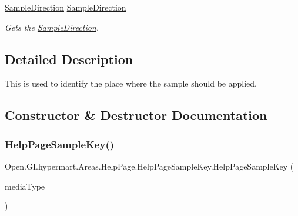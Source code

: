 \begin{DoxyCompactItemize}
\hyperlink{namespace_open_1_1_g_i_1_1hypermart_1_1_areas_1_1_help_page_a96790152101b7f9c7e4ff518bb45c822}{Sample\+Direction} \hyperlink{class_open_1_1_g_i_1_1hypermart_1_1_areas_1_1_help_page_1_1_help_page_sample_key_a62a3b3c50ce55cf2b20b4f859776f884}{Sample\+Direction}
\begin{DoxyCompactList}\small\item\em Gets the \hyperlink{class_open_1_1_g_i_1_1hypermart_1_1_areas_1_1_help_page_1_1_help_page_sample_key_a62a3b3c50ce55cf2b20b4f859776f884}{Sample\+Direction}. \end{DoxyCompactList}\end{DoxyCompactItemize}


\subsection{Detailed Description}
This is used to identify the place where the sample should be applied. 



\subsection{Constructor \& Destructor Documentation}
\hypertarget{class_open_1_1_g_i_1_1hypermart_1_1_areas_1_1_help_page_1_1_help_page_sample_key_ad8a76b6a8eb3e52035d2dd20d0a9706b}{}\label{class_open_1_1_g_i_1_1hypermart_1_1_areas_1_1_help_page_1_1_help_page_sample_key_ad8a76b6a8eb3e52035d2dd20d0a9706b} 
\subsubsection{\texorpdfstring{Help\+Page\+Sample\+Key()}{HelpPageSampleKey()}\hspace{0.1cm}{\footnotesize\ttfamily [1/4]}}
{\footnotesize\ttfamily Open.\+G\+I.\+hypermart.\+Areas.\+Help\+Page.\+Help\+Page\+Sample\+Key.\+Help\+Page\+Sample\+Key (\begin{DoxyParamCaption}\item[{Media\+Type\+Header\+Value}]{media\+Type }\end{DoxyParamCaption})}



